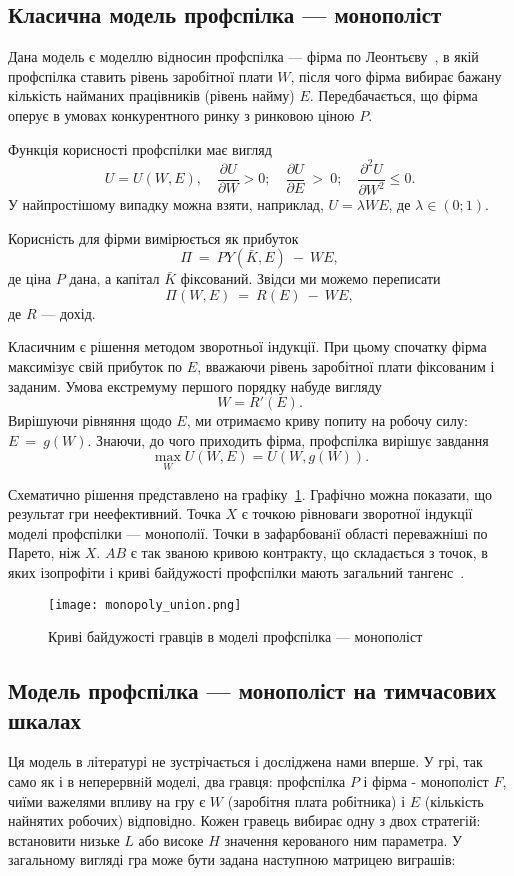 \subsection{Класична модель профспілка --- монополіст}
\label{sec:monopoly}

Дана модель є моделлю відносин профспілка --- фірма по
Леонтьєву~\cite{LeontiefW}, в якій профспілка ставить рівень заробітної плати $ W $,
після чого фірма вибирає бажану кількість найманих працівників (рівень
найму) $ E $. Передбачається, що фірма оперує в умовах конкурентного ринку з
ринковою ціною $ P $.

Функція корисності профспілки має вигляд
$$ 
	U = U(W,E), 
	\quad 
		\frac{\partial U}{\partial W} > 0; 
	\quad 
		\frac{\partial U}{\partial E}~>~0;
	\quad   
		\frac{\partial^2 U}{\partial W^2} \leqslant 0.
$$ 
У найпростішому випадку можна взяти, наприклад, $U = \lambda WE$, де $\lambda \in (0; 1)$.

Корисність для фірми вимірюється як прибуток
$$
	\Pi~=~PY(\bar K,E)~-~WE,
$$ 
де ціна $P$ дана, а капітал $\bar K$ фіксований. Звідси ми можемо переписати 
$$
	\Pi(W,E)~=~R(E)~-~WE,
$$ 
де $R$ --- дохід.

Класичним є рішення методом зворотньої індукції.
При цьому спочатку фірма максимізує свій прибуток по $ E $, вважаючи рівень
заробітної плати фіксованим і заданим. Умова екстремуму першого порядку набуде вигляду
$$ 
	W = R'(E).
$$
Вирішуючи рівняння щодо $ E $, ми отримаємо криву попиту на робочу силу: $E~=~g(W)$.
Знаючи, до чого приходить фірма, профспілка вирішує завдання
$$ 
	\max_W U(W,E) = U(W, g(W)).
$$

Схематично рішення представлено на графіку~\ref{fig:monopoly_union}.
Графічно можна показати, що результат гри неефективний. Точка $ X $ є
точкою рівноваги зворотної індукції моделі профспілки --- монополії. Точки в
зафарбованiї області переважнішi по Парето, ніж $ X $. $ AB $ є так званою
кривою контракту, що складається з точок, в яких ізопрофіти і криві байдужості
профспілки мають загальний тангенс~\cite{ShandongUniver}.


\begin{figure}[h]
	\centering
	\texttt{[image: monopoly\_union.png]}
	\caption{Криві байдужості гравців в моделі профспілка --- монополіст}
	\label{fig:monopoly_union}
\end{figure}

\subsection{Модель профспілка --- монополіст на тимчасових шкалах}
Ця модель в літературі не зустрічається і досліджена нами вперше.
У грі, так само як і в неперервнiй моделі, два гравця: профспілка $ P $ і фірма - монополіст
$ F $, чиїми важелями впливу на гру є $ W $ (заробітня плата робітника) і $ E $
(кількість найнятих робочих) відповідно. Кожен гравець вибирає одну з двох
стратегій: встановити низьке $ L $ або високе $ H $ значення керованого ним параметра.
У загальному вигляді гра може бути задана наступною матрицею виграшів:

